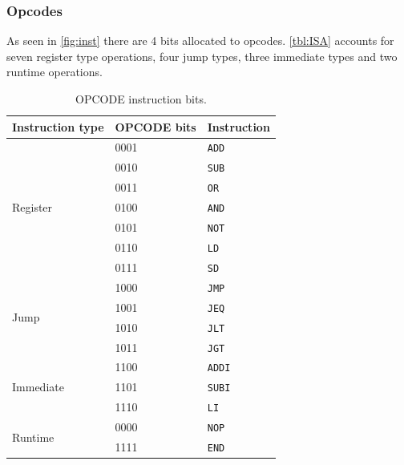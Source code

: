 \documentclass[a4paper, english]{article}
\numberwithin{equation}{section}
\begin{document}
\subsubsection{Opcodes}
As seen in \cref{fig:inst} there are 4 bits allocated to opcodes. \cref{tbl:ISA} accounts for seven register type operations, four jump types, three immediate types and two runtime operations.
\begin{table}[H]
    \centering
    \caption{OPCODE instruction bits.}\label{tbl:opcode}
    \begin{tabular}{lll}
        \toprule
        Instruction type           & OPCODE bits & Instruction   \\
        \midrule
        \multirow{7}{*}{Register}  & 0001       & \texttt{ADD}  \\
                                   & 0010       & \texttt{SUB}  \\
                                   & 0011       & \texttt{OR}   \\
                                   & 0100       & \texttt{AND}  \\
                                   & 0101       & \texttt{NOT}  \\
                                   & 0110       & \texttt{LD}   \\
                                   & 0111       & \texttt{SD}   \\
        \midrule
        \multirow{4}{*}{Jump}      & 1000       & \texttt{JMP}  \\
                                   & 1001       & \texttt{JEQ}  \\
                                   & 1010       & \texttt{JLT}  \\
                                   & 1011       & \texttt{JGT}  \\
        \midrule
        \multirow{3}{*}{Immediate} & 1100       & \texttt{ADDI} \\
                                   & 1101       & \texttt{SUBI} \\
                                   & 1110       & \texttt{LI}   \\
        \midrule
        \multirow{2}{*}{Runtime}   & 0000       & \texttt{NOP}  \\
                                   & 1111       & \texttt{END}  \\
        \bottomrule
    \end{tabular}
\end{table}
\end{document}

